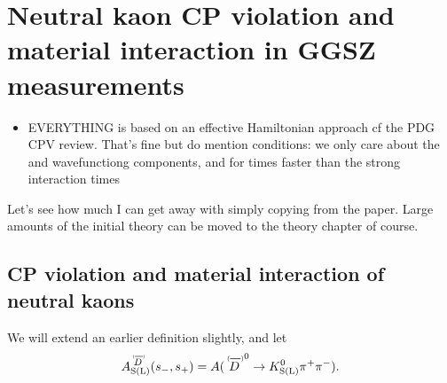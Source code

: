 

\chapter{Neutral kaon CP violation and material interaction in GGSZ measurements}
\label{ch:4-KS-CPV}


\begin{itemize}
    \item EVERYTHING is based on an effective Hamiltonian approach cf the PDG CPV review. That's fine but do mention conditions: we only care about the \KS and \KL wavefunctiong components, and for times faster than the strong interaction times
\end{itemize}

Let's see how much I can get away with simply copying from the paper.
Large amounts of the initial theory can be moved to the theory chapter of course.

\section{CP violation and material interaction of neutral kaons} %
\label{sec:cp_violation_and_material_interaction_of_neutral_kaons}

We will extend an earlier definition slightly, and let
\begin{align}\label{eq:ADDb_definition_with_KL}
\ADorDbSL (\smpLong)= A(\DorDbar^0\to K^0_\text{S(L)} \pi^+\pi^-).
\end{align}

